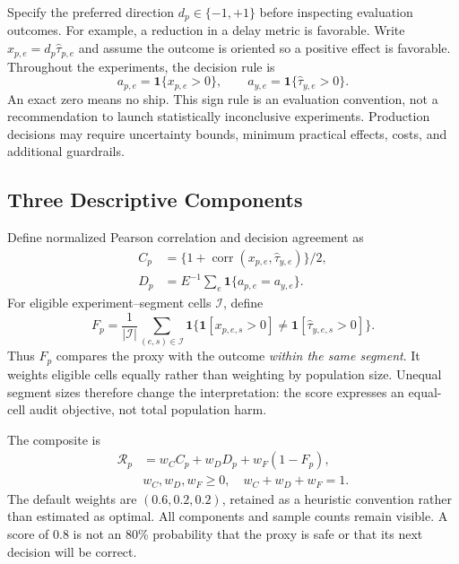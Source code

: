 \documentclass{ieeeaccess}
\newcommand{\ind}{\mathbf{1}}
\newcommand{\Rscore}{\mathcal{R}}
\begin{document}
Specify the preferred direction $d_p\in\{-1,+1\}$ before inspecting evaluation outcomes. For example, a reduction in a delay metric is favorable. Write $x_{p,e}=d_p\widehat\tau_{p,e}$ and assume the outcome is oriented so a positive effect is favorable. Throughout the experiments, the decision rule is
\begin{equation}
 a_{p,e}=\ind\{x_{p,e}>0\},\qquad
 a_{y,e}=\ind\{\widehat\tau_{y,e}>0\}.
\end{equation}
An exact zero means no ship. This sign rule is an evaluation convention, not a recommendation to launch statistically inconclusive experiments. Production decisions may require uncertainty bounds, minimum practical effects, costs, and additional guardrails.

\subsection{Three Descriptive Components}
Define normalized Pearson correlation and decision agreement as
\begin{align}
 C_p&=\{1+\operatorname{corr}(x_{p,e},\widehat\tau_{y,e})\}/2,\\
 D_p&=E^{-1}\sum_e\ind\{a_{p,e}=a_{y,e}\}.
\end{align}
For eligible experiment--segment cells $\mathcal{I}$, define
\begin{equation}
 F_p=\frac{1}{|\mathcal{I}|}\sum_{(e,s)\in\mathcal{I}}
 \ind\{\ind[x_{p,e,s}>0]\ne\ind[\widehat\tau_{y,e,s}>0]\}.
\end{equation}
Thus $F_p$ compares the proxy with the outcome \emph{within the same segment}. It weights eligible cells equally rather than weighting by population size. Unequal segment sizes therefore change the interpretation: the score expresses an equal-cell audit objective, not total population harm.

The composite is
\begin{equation}
 \begin{aligned}
 \Rscore_p&=w_C C_p+w_D D_p+w_F(1-F_p),\\
 &w_C,w_D,w_F\geq0,\quad w_C+w_D+w_F=1.
 \end{aligned}
\end{equation}
The default weights are $(0.6,0.2,0.2)$, retained as a heuristic convention rather than estimated as optimal. All components and sample counts remain visible. A score of 0.8 is not an 80\% probability that the proxy is safe or that its next decision will be correct.
\end{document}
